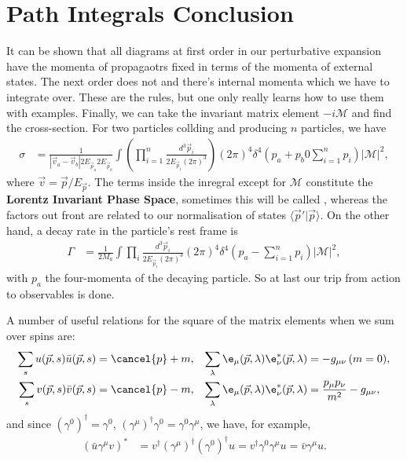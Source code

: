 \documentclass[relqm.tex]{subfiles}
\begin{document}
\section{Path Integrals Conclusion}
It can be shown that all diagrams at first order in our perturbative expansion have the momenta of propagaotrs fixed in terms of the momenta of external states. 
The next order does not and there's internal momenta which we have to integrate over. 
These are the rules, but one only really learns how to use them with examples. 
Finally, we can take the invariant matrix element $-i\mathcal{M}$ and find the cross-section. 
For two particles collding and producing $n$ particles, we have
\begin{align}
    \sigma &= \frac{1}{|\vec{v}_a-\vec{v}_b|2E_{\vec{p}_a}2E_{\vec{p}_b}} \int \left(\prod_{i=1}^n\frac{d^3\vec{p}_i}{2E_{\vec{p}_i}(2\pi)^3}\right)(2\pi)^4\delta^4\left(p_a+p_b0\sum_{i=1}^np_i\right)|\mathcal{M}|^2,
\end{align}
where $\vec{v}=\vec{p}/E_{\vec{p}}$.
The terms inside the inregral except for $\mathcal{M}$ constitute the \textbf{Lorentz Invariant Phase Space}, sometimes this will be called \lips, whereas the factors out front are related to our normalisation of states $\langle\vec{p}'|\vec{p}\rangle$. 
On the other hand, a decay rate in the particle's rest frame is
\begin{align}
    \Gamma &= \frac{1}{2M_a}\int \prod_i \frac{d^3\vec{p}_i}{2E_{\vec{p}_i}(2\pi)^3}(2\pi)^4\delta^4\left(p_a-\sum_{i=1}^n p_i\right)|\mathcal{M}|^2,
\end{align}
with $p_a$ the four-momenta of the decaying particle. 
So at last our trip from action to observables is done. 

A number of useful relations for the square of the matrix elements when we sum over spins are:
\begin{align}
    \sum_s u(\vec{p},s)\bar{u}(\vec{p},s) &= \cancel{p}+m, & \sum_{\lambda}\e_\mu(\vec{p},\lambda)\e_\nu^*(\vec{p},\lambda)&=-g_{\mu\nu}\,(m=0), \\
    \sum_s v(\vec{p},s)\bar{v}(\vec{p},s) &= \cancel{p}-m, & \sum_\lambda \e_\mu(\vec{p},\lambda)\e_\nu^*(\vec{p},\lambda) &= \frac{p_\mu p_\nu}{m^2}-g_{\mu\nu},
\end{align}
and since $(\gamma^0)^\dagger = \gamma^0$, $(\gamma^\mu)^\dagger \gamma^0 = \gamma^0\gamma^\mu$, we have, for example, 
\begin{align}
    (\bar{u}\gamma^\mu v)^* &= v^\dagger (\gamma^\mu)^\dagger(\gamma^0)^\dagger u = v^\dagger \gamma^0\gamma^\mu u = \bar{v}\gamma^\mu u.
\end{align}
\end{document}
